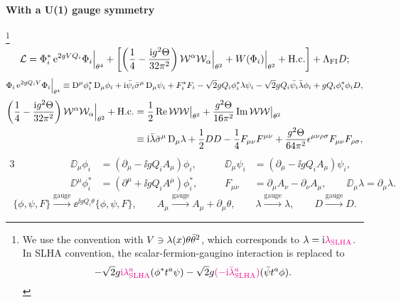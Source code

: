 \documentclass[CheatSheet]{subfiles}
\begin{document}
\paragraph{With a U(1) gauge symmetry}
\footnote{
  We use the convention with $V\ni\lambda(x)\theta\bar\theta^2$, which corresponds to $\lambda=\mathrm{i}{\color{magenta}\lambda_{\mathrm{SLHA}}}$. In SLHA convention, the scalar-fermion-gaugino interaction is replaced to 
\begin{equation*}
  -\sqrt{2}g{{\color{magenta}\mathrm{i}\lambda^a_{\mathrm{SLHA}}}} (\phi^*t^a\psi)
 -\sqrt{2}g{{\color{magenta}(-\mathrm{i}\bar\lambda^a_{\mathrm{SLHA}})}}(\bar\psi t^a\phi).
\end{equation*}
}%
\begin{equation}
   \mathcal L =
\Phi^*_i \mathop{}\!\mathrm{e}^{2gV Q_i}\Phi_i\Big|_{\theta^4}
+
\biggl[
\left(\frac14 - \frac{\mathrm{i} g^2\Theta}{32\pi^2}\right)
\mathcal W^\alpha\mathcal W_\alpha\Big|_{\theta^2} +
W(\Phi_i)\Big|_{\theta^2} + \text{H.c.}
\biggr]
+
\Lambda_{\mathrm{FI}}D;
\end{equation}\vskip-18pt
\begin{equation}
\Phi_i \mathop{}\!\mathrm{e}^{2gQ_i V} \Phi_i\Big|_{\theta^4}
\equiv
\mathop{}\!\mathrm{D}^{\mu}\phi_i^*\mathop{}\!\mathrm{D}_{\mu}\phi_i
+\mathrm{i} \bar{\psi_i}\bar\sigma^{\mu}\mathop{}\!\mathrm{D}_{\mu}\psi_i
+F_i^*F_i
-\sqrt{2} g Q_i \phi_i^*\lambda\psi_i
-\sqrt{2} g Q_i \bar{\psi_i}\bar{\lambda}\phi_i
+g Q_i \phi_i^*\phi_i D,
\end{equation}\vskip-18pt
\begin{equation}
\begin{split}
 \left(\frac14 - \frac{\mathrm{i} g^2\Theta}{32\pi^2}\right)
 \mathcal W^\alpha\mathcal W_\alpha\Big|_{\theta^2}+\text{H.c.}
 &= \frac{1}{2}\mathop{\mathrm{Re}}\mathcal W\mathcal W\big|_{\theta^2}
 + \frac{g^2\Theta}{16\pi^2}\mathop{\mathrm{Im}}\mathcal W\mathcal W\big|_{\theta^2}
 \\
 &\equiv \mathrm{i}\bar{\lambda}\bar\sigma^{\mu}\mathop{}\!\mathrm{D}_{\mu}\lambda
 +\frac12DD
 -\frac14F_{\mu\nu}F^{\mu\nu}
 +\frac{g^2\Theta}{64\pi^2}\epsilon^{\mu \nu\rho\sigma}
 F_{\mu\nu}F_{\rho\sigma},
\end{split}
\end{equation}\vskip-18pt
\begin{alignat*}{3}
\qquad\qquad&&
 \DD_{\mu}\phi_i&=(\partial_\mu-\ii g Q_i A_\mu)\phi_i, \qquad&
 \DD_{\mu}\psi_i&=(\partial_\mu-\ii g Q_i A_\mu)\psi_i, \\&&
\DD^{\mu}\phi_i^*&=(\partial^\mu+\ii g Q_i A^\mu)\phi_i^*, &
 F_{\mu\nu} &= \partial_\mu A_\nu-\partial_\nu A_\mu,\qquad
\DD_\mu\lambda=\partial_\mu\lambda.
\end{alignat*}\vskip-18pt
\begin{equation}
  \{\phi,\psi,F\}\xrightarrow{\text{gauge}}
 \ee^{\ii g Q_i \theta}\{\phi,\psi,F\},\qquad
  A_\mu\xrightarrow{\text{gauge}} A_\mu+\partial_\mu \theta,\qquad
  \lambda\xrightarrow{\text{gauge}}\lambda,\qquad
  D\xrightarrow{\text{gauge}}D.
\end{equation}
\end{document}
